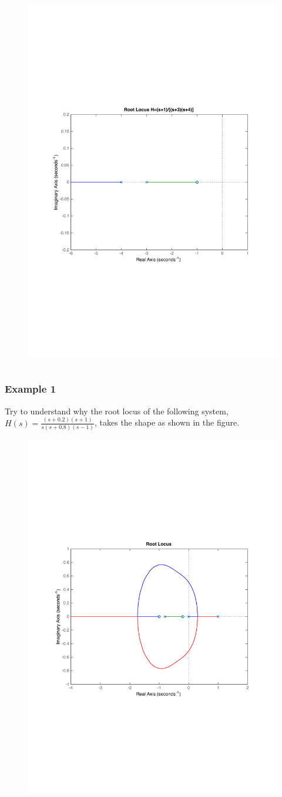 \begin{frame}
\begin{alertblock}{}
\begin{columns}
\begin{column}{0.5\textwidth}
\begin{figure}
				\includegraphics[width=0.8\linewidth]{how_to_draw_easy_ex2}
			\end{figure}
		\end{column}
	\end{columns}
	\end{alertblock}
\end{frame}

\begin{frame}
	\frametitle{Example 1}
	\begin{example}
		Try to understand why the root locus of the following system, $H(s) = \frac{(s + 0.2)(s + 1)}{s(s + 0.8)(s - 1)}$, takes the shape as shown in the figure.
		\begin{figure}
			\centering
			\includegraphics[width=0.5\linewidth]{simple_ex1}
		\end{figure}
	\end{example}
\end{frame}

